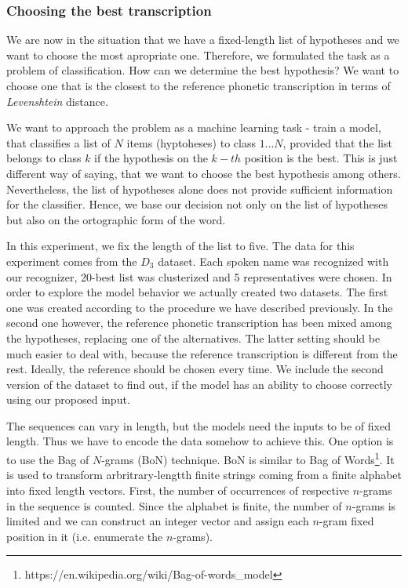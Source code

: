 \subsubsection{Choosing the best transcription}
We are now in the situation that we have a fixed-length list of hypotheses and we want to choose the most apropriate one.
Therefore, we formulated the task as a problem of classification.
How can we determine the best hypothesis?
We want to choose one that is the closest to the reference phonetic transcription in terms of \textit{Levenshtein} distance.
\par
We want to approach the problem as a machine learning task - train a model, that classifies a list of $N$ items (hyptoheses) to class $1\dots N$, provided that the list belongs to class $k$ if the hypothesis on the $k-th$ position is the best.
This is just different way of saying, that we want to choose the best hypothesis among others.
Nevertheless, the list of hypotheses alone does not provide sufficient information for the classifier.
Hence, we base our decision not only on the list of hypotheses but also on the ortographic form of the word.
\par
In this experiment, we fix the length of the list to five.
The data for this experiment comes from the $D_3$ dataset.
Each spoken name was recognized with our recognizer, 20-best list was clusterized and 5 representatives were chosen.
In order to explore the model behavior we actually created two datasets.
The first one was created according to the procedure we have described previously.
In the second one however, the reference phonetic transcription has been mixed among the hypotheses, replacing one of the alternatives.
The latter setting should be much easier to deal with, because the reference transcription is different from the rest.
Ideally, the reference should be chosen every time.
We include the second version of the dataset to find out, if the model has an ability to choose correctly using our proposed input.
\par
The sequences can vary in length, but the models need the inputs to be of fixed length.
Thus we have to encode the data somehow to achieve this.
One option is to use the Bag of $N$-grams (BoN) technique.
BoN is similar to Bag of Words\footnote{https://en.wikipedia.org/wiki/Bag-of-words\_model}.
It is used to transform arbritrary-lengtth finite strings coming from a finite alphabet into fixed length vectors.
First, the number of occurrences of respective $n$-grams in the sequence is counted.
Since the alphabet is finite, the number of $n$-grams is limited and we can construct an integer vector and assign each $n$-gram fixed position in it (i.e. enumerate the $n$-grams).
